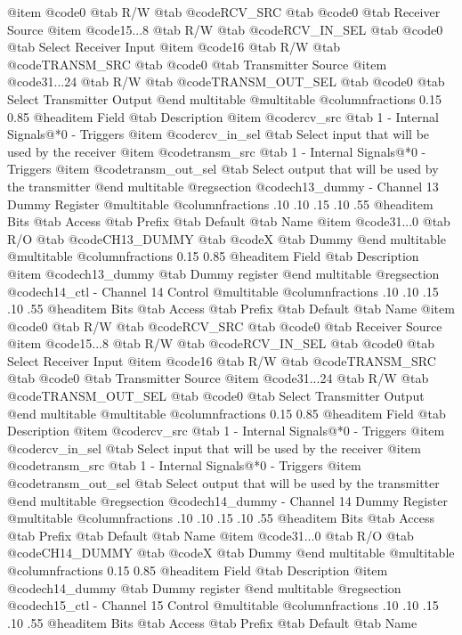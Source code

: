 @item @code{0}
@tab R/W @tab
@code{RCV_SRC}
@tab @code{0} @tab 
Receiver Source
@item @code{15...8}
@tab R/W @tab
@code{RCV_IN_SEL}
@tab @code{0} @tab 
Select Receiver Input
@item @code{16}
@tab R/W @tab
@code{TRANSM_SRC}
@tab @code{0} @tab 
Transmitter Source
@item @code{31...24}
@tab R/W @tab
@code{TRANSM_OUT_SEL}
@tab @code{0} @tab 
Select Transmitter Output
@end multitable
@multitable @columnfractions 0.15 0.85
@headitem Field @tab Description
@item @code{rcv_src} @tab 1 - Internal Signals@*0 - Triggers
@item @code{rcv_in_sel} @tab Select input that will be used by the receiver
@item @code{transm_src} @tab 1 - Internal Signals@*0 - Triggers
@item @code{transm_out_sel} @tab Select output that will be used by the transmitter
@end multitable
@regsection @code{ch13_dummy} - Channel 13 Dummy Register
@multitable @columnfractions .10 .10 .15 .10 .55
@headitem Bits @tab Access @tab Prefix @tab Default @tab Name
@item @code{31...0}
@tab R/O @tab
@code{CH13_DUMMY}
@tab @code{X} @tab 
Dummy
@end multitable
@multitable @columnfractions 0.15 0.85
@headitem Field @tab Description
@item @code{ch13_dummy} @tab Dummy register
@end multitable
@regsection @code{ch14_ctl} - Channel 14 Control
@multitable @columnfractions .10 .10 .15 .10 .55
@headitem Bits @tab Access @tab Prefix @tab Default @tab Name
@item @code{0}
@tab R/W @tab
@code{RCV_SRC}
@tab @code{0} @tab 
Receiver Source
@item @code{15...8}
@tab R/W @tab
@code{RCV_IN_SEL}
@tab @code{0} @tab 
Select Receiver Input
@item @code{16}
@tab R/W @tab
@code{TRANSM_SRC}
@tab @code{0} @tab 
Transmitter Source
@item @code{31...24}
@tab R/W @tab
@code{TRANSM_OUT_SEL}
@tab @code{0} @tab 
Select Transmitter Output
@end multitable
@multitable @columnfractions 0.15 0.85
@headitem Field @tab Description
@item @code{rcv_src} @tab 1 - Internal Signals@*0 - Triggers
@item @code{rcv_in_sel} @tab Select input that will be used by the receiver
@item @code{transm_src} @tab 1 - Internal Signals@*0 - Triggers
@item @code{transm_out_sel} @tab Select output that will be used by the transmitter
@end multitable
@regsection @code{ch14_dummy} - Channel 14 Dummy Register
@multitable @columnfractions .10 .10 .15 .10 .55
@headitem Bits @tab Access @tab Prefix @tab Default @tab Name
@item @code{31...0}
@tab R/O @tab
@code{CH14_DUMMY}
@tab @code{X} @tab 
Dummy
@end multitable
@multitable @columnfractions 0.15 0.85
@headitem Field @tab Description
@item @code{ch14_dummy} @tab Dummy register
@end multitable
@regsection @code{ch15_ctl} - Channel 15 Control
@multitable @columnfractions .10 .10 .15 .10 .55
@headitem Bits @tab Access @tab Prefix @tab Default @tab Name
